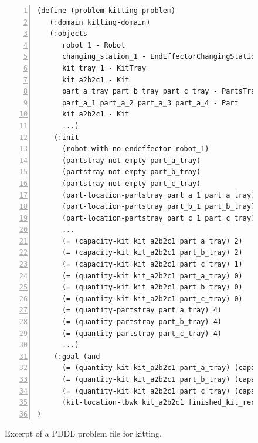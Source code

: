 \begin{figure}[t!h!]
\begin{minipage}{.7\paperwidth}
\begin{list}{}{\setlength{\leftmargin}{1em}}\item\small
\begin{Verbatim}[commandchars=\\\{\},fontsize=\scriptsize, numbers=left, numbersep=2pt]
(define (problem kitting-problem)
   (:domain kitting-domain)
   (:objects
      robot_1 - Robot
      changing_station_1 - EndEffectorChangingStation
      kit_tray_1 - KitTray
      kit_a2b2c1 - Kit
      part_a_tray part_b_tray part_c_tray - PartsTray
      part_a_1 part_a_2 part_a_3 part_a_4 - Part
      kit_a2b2c1 - Kit
      ...)
    (:init
      (robot-with-no-endeffector robot_1)
      (partstray-not-empty part_a_tray)
      (partstray-not-empty part_b_tray)
      (partstray-not-empty part_c_tray)
      (part-location-partstray part_a_1 part_a_tray)
      (part-location-partstray part_b_1 part_b_tray)
      (part-location-partstray part_c_1 part_c_tray)
      ...
      (= (capacity-kit kit_a2b2c1 part_a_tray) 2)
      (= (capacity-kit kit_a2b2c1 part_b_tray) 2)
      (= (capacity-kit kit_a2b2c1 part_c_tray) 1)
      (= (quantity-kit kit_a2b2c1 part_a_tray) 0)
      (= (quantity-kit kit_a2b2c1 part_b_tray) 0)
      (= (quantity-kit kit_a2b2c1 part_c_tray) 0)
      (= (quantity-partstray part_a_tray) 4)
      (= (quantity-partstray part_b_tray) 4)
      (= (quantity-partstray part_c_tray) 4)
      ...)
    (:goal (and
      (= (quantity-kit kit_a2b2c1 part_a_tray) (capacity-kit kit_a2b2c1 part_a_tray))
      (= (quantity-kit kit_a2b2c1 part_b_tray) (capacity-kit kit_a2b2c1 part_b_tray))
      (= (quantity-kit kit_a2b2c1 part_c_tray) (capacity-kit kit_a2b2c1 part_c_tray))
      (kit-location-lbwk kit_a2b2c1 finished_kit_receiver))
)
\end{Verbatim}
\end{list}
\end{minipage}
\caption{Excerpt of a PDDL problem file for kitting.}
\label{fig:problem}
\end{figure}

